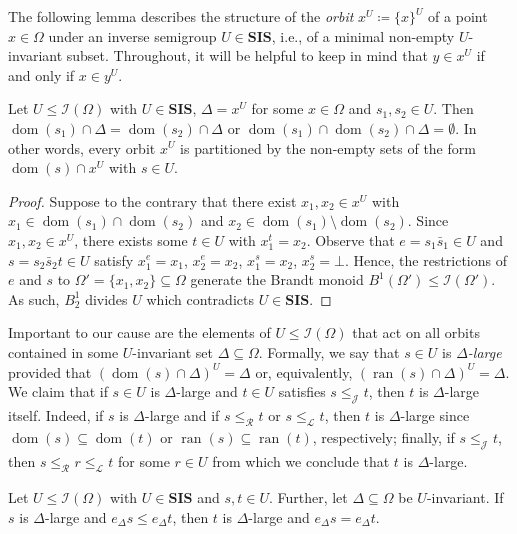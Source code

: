 \documentclass[anonymous,letter,UKenglish,cleveref,autoref,thm-restate]{lipics-v2021}
\renewcommand{\leq}{\leqslant}
\newcommand{\sse}{\subseteq}
\newcommand{\dom}{\operatorname{dom}}
\newcommand{\ran}{\operatorname{ran}}
\newcommand{\vSI}{\ensuremath{\mathbf{SIS}}}
\newcommand{\ISym}{\cI}
\newcommand*{\gLle}[1][]{\leq_{\mathcal{L}_{#1}}}
\newcommand*{\gRle}[1][]{\leq_{\mathcal{R}_{#1}}}
\newcommand*{\gJle}[1][]{\leq_{\mathcal{J}_{#1}}}
\newcommand{\cI}{\mathcal{I}}
\theoremstyle{plain}
\theoremstyle{plain}
\begin{document}
The following lemma describes the structure of the \emph{orbit} $x^U \coloneqq \{x\}^U$ of a point $x \in \Omega$ under an inverse semigroup $U \in \vSI$, i.e., of a minimal non-empty $U$-invariant subset.
Throughout, it will be helpful to keep in mind that $y \in x^U$ if and only if $x \in y^U$.

\begin{lemma}\label{lem:gb-orbits}
  Let $U \leq \ISym(\Omega)$ with $U \in \vSI$, $\Delta = x^U$ for some $x \in \Omega$ and $s_1, s_2 \in U$.
  Then $\dom(s_1) \cap \Delta = \dom(s_2) \cap \Delta$ or $\dom(s_1) \cap \dom(s_2) \cap \Delta = \emptyset$.
  In other words, every orbit $x^U$ is partitioned by the non-empty sets of the form $\dom(s) \cap x^U$ with $s \in U$.
\end{lemma}

\begin{proof}
  Suppose to the contrary that there exist $x_1, x_2 \in x^U$ with $x_1 \in \dom(s_1) \cap \dom(s_2)$ and $x_2 \in \dom(s_1) \setminus \dom(s_2)$.
  Since $x_1, x_2 \in x^U$, there exists some $t \in U$ with $x_1^t = x_2$.
  Observe that $e = s_1 \bar s_1 \in U$ and $s = s_2 \bar s_2 t \in U$ satisfy  $x_1^e = x_1$, $x_2^e = x_2$, $x_1^s = x_2$, $x_2^s = \bot$.
  Hence, the restrictions of $e$ and $s$ to $\Omega' = \{x_1,x_2\} \sse \Omega$ generate the Brandt monoid $B^1(\Omega') \leq \ISym(\Omega')$.
  As such, $B_2^1$ divides $U$ which contradicts $U \in \vSI$.
\end{proof}

Important to our cause are the elements of $U \leq \ISym(\Omega)$ that act on all orbits contained in some $U$-invariant set $\Delta \sse \Omega$.
Formally, we say that $s \in U$ is \emph{$\Delta$-large} provided that $(\dom(s)\cap \Delta)^U = \Delta$ or, equivalently, $(\ran(s)\cap \Delta)^U = \Delta$.
We claim that if $s \in U$ is $\Delta$-large and $t \in U$ satisfies $s \gJle t$, then $t$ is $\Delta$-large itself.
Indeed, if $s$ is $\Delta$-large and if $s \gRle t$ or $s \gLle t$, then $t$ is $\Delta$-large since $\dom(s) \sse \dom(t)$ or $\ran(s) \sse \ran(t)$, respectively; finally, if $s \gJle t$, then $s \gRle r \gLle t$ for some $r \in U$ from which we conclude that $t$ is $\Delta$-large.

\begin{lemma}\label{lem:gb-large}
  Let $U \leq \ISym(\Omega)$ with $U \in \vSI$ and $s,t \in U$. 
  Further, let $\Delta \sse \Omega$ be $U$-invariant.
  If $s$ is $\Delta$-large and $e_\Delta s \leq e_\Delta t$, then $t$ is $\Delta$-large and $e_\Delta s = e_\Delta t$.
\end{lemma}
\end{document}
